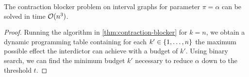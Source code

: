 \begin{corollary}
The contraction blocker problem on interval graphs for parameter $\pi = \alpha$ can be solved in time $\mathcal{O}(n^3)$.
\end{corollary}
\begin{proof}
Running the algorithm in \cref{thm:contraction-blocker} for $k = n$, we obtain a dynamic programming table containing for each $k' \in \{ 1, \ldots, n \}$ the maximum possible effect the interdictor can achieve with a budget of $k'$. Using binary search, we can find the minimum budget $k'$ necessary to reduce $\alpha$ down to the threshold $t$.
\end{proof}
